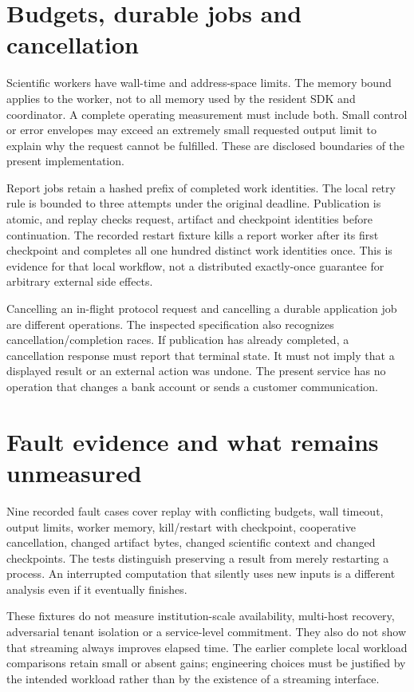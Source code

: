\section{Budgets, durable jobs and cancellation}

Scientific workers have wall-time and address-space limits. The memory bound
applies to the worker, not to all memory used by the resident SDK and
coordinator. A complete operating measurement must include both. Small control
or error envelopes may exceed an extremely small requested output limit to
explain why the request cannot be fulfilled. These are disclosed boundaries of
the present implementation.\cite{v12_in_runtime}

Report jobs retain a hashed prefix of completed work identities. The local
retry rule is bounded to three attempts under the original deadline. Publication
is atomic, and replay checks request, artifact and checkpoint identities before
continuation. The recorded restart fixture kills a report worker after its
first checkpoint and completes all one hundred distinct work identities once.
This is evidence for that local workflow, not a distributed exactly-once
guarantee for arbitrary external side effects.

Cancelling an in-flight protocol request and cancelling a durable application
job are different operations. The inspected specification also recognizes
cancellation/completion races.\cite{v12_mcp_legacy_cancellation} If publication
has already completed, a cancellation response must report that terminal state.
It must not imply that a displayed result or an external action was undone.
The present service has no operation that changes a bank account or sends a
customer communication.

\section{Fault evidence and what remains unmeasured}

Nine recorded fault cases cover replay with conflicting budgets, wall timeout,
output limits, worker memory, kill/restart with checkpoint, cooperative
cancellation, changed artifact bytes, changed scientific context and changed
checkpoints.\cite{v12_in_runtime} The tests distinguish preserving a result from
merely restarting a process. An interrupted computation that silently uses new
inputs is a different analysis even if it eventually finishes.

These fixtures do not measure institution-scale availability, multi-host
recovery, adversarial tenant isolation or a service-level commitment. They also
do not show that streaming always improves elapsed time. The earlier complete
local workload comparisons retain small or absent gains; engineering choices
must be justified by the intended workload rather than by the existence of a
streaming interface.

